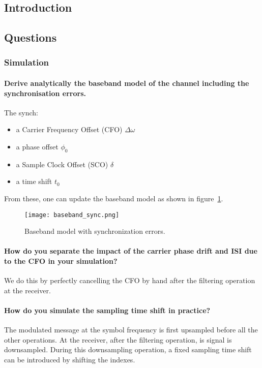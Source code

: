 \subsection{Introduction}


\subsection{Questions}
\subsubsection{Simulation}

\paragraph{Derive analytically the baseband model of the channel including the synchronisation errors.} The synch:
\begin{itemize}
\item a Carrier Frequency Offset (CFO) $\Delta \omega$
\item a phase offset $\phi_0$
\item a Sample Clock Offset (SCO) $\delta$
\item a time shift $t_0$
\end{itemize}
From these, one can update the baseband model as shown in figure~\ref{fig:sync}.

\begin{figure}[htbp]
\texttt{[image: baseband\_sync.png]}
\caption{Baseband model with synchronization errors.\label{fig:sync}}
\end{figure}


\paragraph{How do you separate the impact of the carrier phase drift and ISI due to the CFO in your simulation?}
We do this by perfectly cancelling the CFO by hand after the filtering operation at the receiver.

\paragraph{How do you simulate the sampling time shift in practice?}The modulated message at the symbol frequency is first upsampled before all the other operations.
At the receiver, after the filtering operation, is signal is downsampled.
During this downsampling operation, a fixed sampling time shift can be introduced by shifting the indexes.

